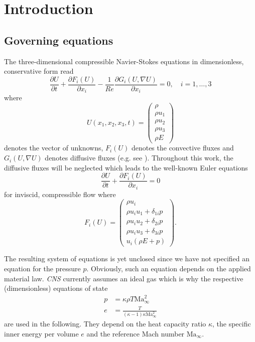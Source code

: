 \section{Introduction}
\label{sec:introduction}

\subsection{Governing equations}
The three-dimensional compressible Navier-Stokes equations in dimensionless,
conservative form read
\begin{equation}
	\frac{\partial U}{\partial t}
	+ \frac{\partial F_i(U)}{\partial x_i}
	- \frac{1}{Re} \frac{\partial G_i(U, \nabla U)}{\partial x_i}
	= 0, \quad i=1,\ldots,3
\end{equation}
where
\begin{equation}
	U(x_1, x_2, x_3, t)
	= \begin{pmatrix}
		\rho \\
		\rho u_1 \\
		\rho u_2 \\
		\rho u_3 \\
		\rho E
	\end{pmatrix}
\end{equation}
denotes the vector of unknowns, $F_i(U)$ denotes the convective fluxes and
$G_i(U, \nabla U)$ denotes diffusive fluxes (e.g. see \cite{Prandtl2008}).
Throughout this work, the diffusive fluxes will be neglected which leads to the
well-known Euler equations
\begin{equation}
\label{equ:Euler}
	\frac{\partial U}{\partial t}
	+ \frac{\partial F_i(U)}{\partial x_i}
	= 0
\end{equation}
for inviscid, compressible flow where
\begin{equation}
	F_i(U)
	= \begin{pmatrix}
		\rho u_i\\
		\rho u_i u_1 + \delta_{1i} p\\
		\rho u_i u_2 + \delta_{2i} p\\
		\rho u_i u_3 + \delta_{3i} p\\
		u_i (\rho E + p)
	\end{pmatrix}.
\end{equation}

The resulting system of equations is yet unclosed since we have not specified an
equation for the pressure $p$. Obviously, such an equation depends on the
applied material law. \emph{CNS} currently assumes an ideal gas which is why the
respective (dimensionless) equations of state
\begin{align}
	p &= \kappa \rho T \mathrm{Ma}_\infty^2\\
	e &= \frac{T}{(\kappa - 1) \kappa \mathrm{Ma}_\infty^2} 
\end{align}
are used in the following. They depend on the heat capacity ratio $\kappa$, the
specific inner energy per volume $e$ and the reference Mach number
$\mathrm{Ma}_\infty$.


